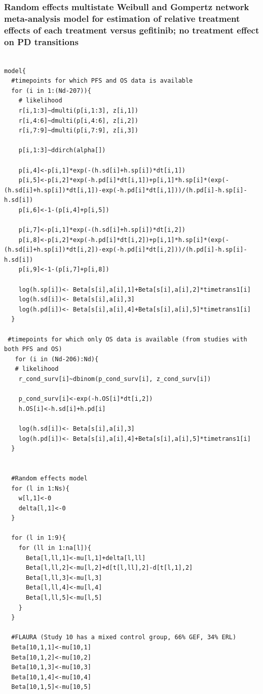 \documentclass[11pt,final,fleqn]{article}\usepackage[]{graphicx}\usepackage[]{color}
\theoremstyle{plain}
\begin{document}
\begin{appendices}
\subsubsection{Random effects multistate Weibull and Gompertz network meta-analysis model for estimation of relative treatment effects of each treatment versus gefitinib; no treatment effect on PD transitions}
\begin{verbatim} 

model{
  #timepoints for which PFS and OS data is available
  for (i in 1:(Nd-207)){
    # likelihood
    r[i,1:3]~dmulti(p[i,1:3], z[i,1]) 
    r[i,4:6]~dmulti(p[i,4:6], z[i,2]) 
    r[i,7:9]~dmulti(p[i,7:9], z[i,3]) 
    
    p[i,1:3]~ddirch(alpha[])
    
    p[i,4]<-p[i,1]*exp(-(h.sd[i]+h.sp[i])*dt[i,1])
    p[i,5]<-p[i,2]*exp(-h.pd[i]*dt[i,1])+p[i,1]*h.sp[i]*(exp(-(h.sd[i]+h.sp[i])*dt[i,1])-exp(-h.pd[i]*dt[i,1]))/(h.pd[i]-h.sp[i]-h.sd[i])
    p[i,6]<-1-(p[i,4]+p[i,5])
    
    p[i,7]<-p[i,1]*exp(-(h.sd[i]+h.sp[i])*dt[i,2])
    p[i,8]<-p[i,2]*exp(-h.pd[i]*dt[i,2])+p[i,1]*h.sp[i]*(exp(-(h.sd[i]+h.sp[i])*dt[i,2])-exp(-h.pd[i]*dt[i,2]))/(h.pd[i]-h.sp[i]-h.sd[i])
    p[i,9]<-1-(p[i,7]+p[i,8])
    
    log(h.sp[i])<- Beta[s[i],a[i],1]+Beta[s[i],a[i],2]*timetrans1[i] 
    log(h.sd[i])<- Beta[s[i],a[i],3] 
    log(h.pd[i])<- Beta[s[i],a[i],4]+Beta[s[i],a[i],5]*timetrans1[i]
  }
  
 #timepoints for which only OS data is available (from studies with both PFS and OS)
   for (i in (Nd-206):Nd){
   # likelihood
    r_cond_surv[i]~dbinom(p_cond_surv[i], z_cond_surv[i]) 
    
    p_cond_surv[i]<-exp(-h.OS[i]*dt[i,2])
    h.OS[i]<-h.sd[i]+h.pd[i]
    
    log(h.sd[i])<- Beta[s[i],a[i],3] 
    log(h.pd[i])<- Beta[s[i],a[i],4]+Beta[s[i],a[i],5]*timetrans1[i]
  }
    
 
  #Random effects model
  for (l in 1:Ns){
    w[l,1]<-0
    delta[l,1]<-0
  }
  
  for (l in 1:9){
    for (ll in 1:na[l]){
      Beta[l,ll,1]<-mu[l,1]+delta[l,ll]
      Beta[l,ll,2]<-mu[l,2]+d[t[l,ll],2]-d[t[l,1],2]
      Beta[l,ll,3]<-mu[l,3]
      Beta[l,ll,4]<-mu[l,4]
      Beta[l,ll,5]<-mu[l,5]
    }
  }
  
  #FLAURA (Study 10 has a mixed control group, 66% GEF, 34% ERL)
  Beta[10,1,1]<-mu[10,1]
  Beta[10,1,2]<-mu[10,2]
  Beta[10,1,3]<-mu[10,3]
  Beta[10,1,4]<-mu[10,4]
  Beta[10,1,5]<-mu[10,5]
  

\end{verbatim}
\end{appendices}
\end{document}
